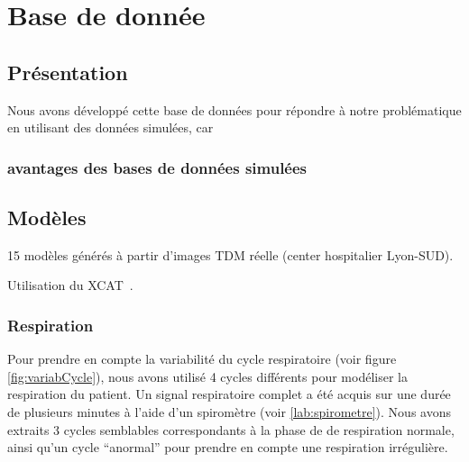 \chapter{Base de donnée}
	\label{lab:bdd}

\section{Présentation}

Nous avons développé cette base de données pour répondre à notre problématique en utilisant des données simulées, car 

	\subsection{avantages des bases de données simulées}



	\section{Modèles}

15 modèles générés à partir d'images TDM réelle (center hospitalier Lyon-SUD). 

Utilisation du XCAT~\cite{segars2009mcatoverview}.

		\subsection{Respiration}


Pour prendre en compte la variabilité du cycle respiratoire (voir figure \ref{fig:variabCycle}), nous avons utilisé 4 cycles différents pour modéliser la respiration du patient. Un signal respiratoire complet a été acquis sur une durée de plusieurs minutes à l'aide d'un spiromètre (voir \ref{lab:spirometre}). Nous avons extraits 3 cycles semblables correspondants à la phase de de respiration normale, ainsi qu'un cycle ``anormal'' pour prendre en compte une respiration irrégulière.

